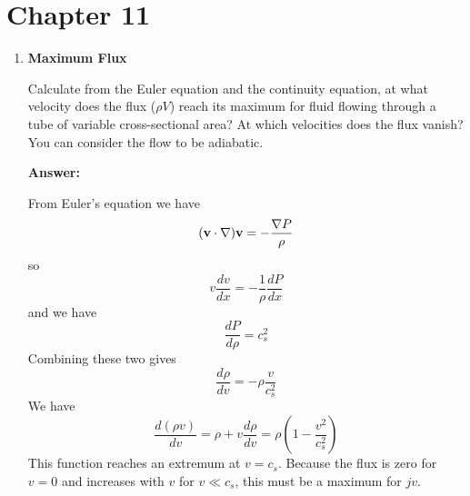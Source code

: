 \documentclass{article}
\newcommand{\dd}[2]{\frac{d {#1}}{d {#2}}}
\begin{document}
\fi

\section{Chapter 11}
\begin{enumerate}
 
\item{\bf Maximum Flux}

Calculate from the Euler equation and the continuity equation, at what
velocity does the flux ($\rho V$) reach its maximum for fluid flowing 
through a tube of variable cross-sectional area?   
At which velocities does the flux vanish?  You can consider the flow
to be adiabatic.

{\bf Answer:}

From Euler's equation we have
\begin{equation}
({\bf v} \cdot \nabla ){\bf v}=-\frac{\nabla P}{\rho}
\end{equation}
so
\begin{equation}
v \dd{v}{x} = -\frac{1}{\rho} \dd{P}{x}
\end{equation}
and we have
\begin{equation}
\dd{P}{\rho} = c_s^2
\end{equation}
Combining these two gives
\begin{equation}
\dd{\rho}{v} = -\rho \frac{v}{c_s^2}
\end{equation}
We have
\begin{equation}
\dd{(\rho v)}{v} = \rho + v \dd{\rho}{v} = \rho \left ( 1  -
\frac{v^2}{c_s^2} \right )
\end{equation}
This function reaches an extremum at $v=c_s$.  Because the flux is
zero for $v=0$ and increases with $v$ for $v \ll c_s$, this must be a
maximum for $jv$.


\end{enumerate}
\end{document}

